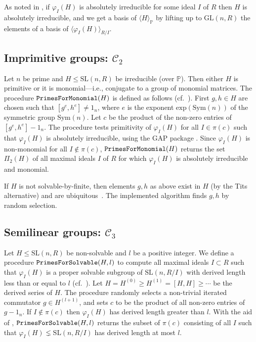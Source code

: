 \documentclass[11pt]{amsart}
\theoremstyle{definition}
\theoremstyle{remark}
\renewcommand{\P}{\mathbb{P}}
\newcommand{\GL}{\mathrm{GL}}
\newcommand{\SL}{\mathrm{SL}}
\newcommand{\calc}{\mathscr{C}}
\begin{document}
As noted in \cite[Section~2.2]{ExpMath}, if $\varphi_I(H)$ is 
absolutely irreducible for some ideal $I$ of $R$ then $H$ is absolutely 
irreducible, and we get a basis of $\langle H \rangle_{\P}$ by lifting 
up to $\GL(n,R)$ the elements of a basis of 
$\langle \varphi_{I}(H)\rangle_{R/I}$. 

\subsection{Imprimitive groups: $\calc_2$} 
\label{Imp}
Let $n$ be prime and $H\leq \SL(n, R)$ be irreducible 
(over $\P$). Then either $H$ is primitive or it is monomial---i.e., 
conjugate to a group of monomial matrices. The procedure 
${\tt PrimesForMonomial}(H)$ is defined as follows 
(cf.~\cite[Section~2.3]{ExpMath}). First  $g, h \in H$ are chosen 
such that $[g^e,h^e]\neq 1_n$, where $e$ is the exponent
$\mathrm{exp}(\mathrm{Sym}(n))$ of the symmetric group 
$\mathrm{Sym}(n)$. Let $c$ be the product of the non-zero entries 
of $[g^e,h^e]-1_n$.
The procedure tests primitivity of $\varphi_I(H)$ for all $I \in \pi(c)$ 
such that $\varphi_I(H)$ is absolutely irreducible, using the 
{\sf GAP} package \cite{NSrecog}. Since  $\varphi_I(H)$ is non-monomial 
for all $I \notin \pi(c)$, ${\tt PrimesForMonomial}(H)$ returns 
 the set $\Pi_2(H)$ of all maximal ideals $I$ of $R$ for which 
$\varphi_I(H)$ is absolutely irreducible and monomial. 

If $H$ is not solvable-by-finite, then elements $g,h$ as above exist
 in $H$ (by the Tits alternative) and are 
ubiquitous~\cite[Section~2.3]{ExpMath}. The implemented algorithm finds
$g, h$ by random selection.

\subsection{Semilinear groups: $\calc_3$} 
\label{Semilinear}

Let $H\leq \SL(n,R)$ be non-solvable and $l$ be a positive 
integer. We define a procedure ${\tt PrimesForSolvable}(H, l)$ 
to compute all maximal ideals $I\subset R$ such that  
$\varphi_I(H)$ is a proper solvable subgroup of $\SL(n,R/I)$ 
with derived length less than or equal to $l$ 
(cf.~\cite[Section~2.4]{ExpMath}).
Let $H = H^{(0)} \geq H^{(1)} = [H,H] \geq \cdots$ be the 
 derived series of $H$. The procedure randomly 
selects a non-trivial iterated commutator 
$g\in H^{(l+1)}$, and sets $c$ to be the product of all 
non-zero entries of $g - 1_n$. If $I \notin \pi(c)$ then
$\varphi_I(H)$ has derived length greater than $l$. With the 
aid of \cite{NSrecog}, ${\tt PrimesForSolvable}(H, l)$ returns 
the subset of $\pi(c)$ consisting of all $I$ such that 
$\varphi_I(H)\lneq \SL(n,R/I)$ has derived length at 
most $l$. 
\end{document}
